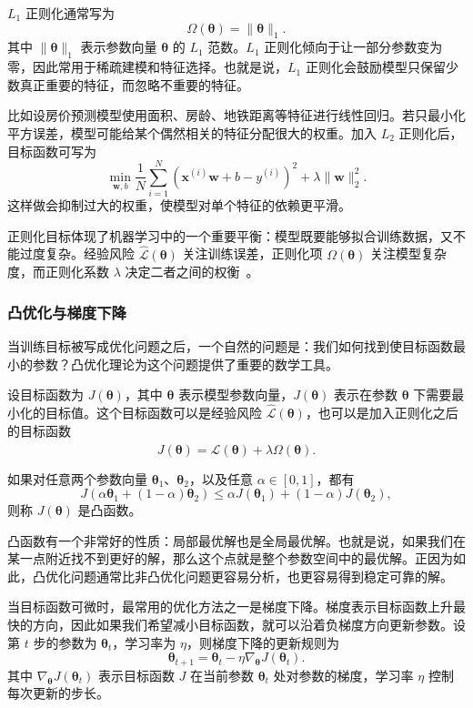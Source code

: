 $L_1$ 正则化通常写为
\[
\Omega(\boldsymbol{\theta})
=
\|\boldsymbol{\theta}\|_1.
\]
其中 $\|\boldsymbol{\theta}\|_1$ 表示参数向量 $\boldsymbol{\theta}$ 的 $L_1$ 范数。$L_1$ 正则化倾向于让一部分参数变为零，因此常用于稀疏建模和特征选择。也就是说，$L_1$ 正则化会鼓励模型只保留少数真正重要的特征，而忽略不重要的特征。


比如设房价预测模型使用面积、房龄、地铁距离等特征进行线性回归。若只最小化平方误差，模型可能给某个偶然相关的特征分配很大的权重。加入 $L_2$ 正则化后，目标函数可写为
  \[
  \min_{\mathbf{w},b}
  \frac{1}{N}
  \sum_{i=1}^{N}
  \left(
    \mathbf{x}^{(i)}\mathbf{w}+b-y^{(i)}
  \right)^2
  +
  \lambda\|\mathbf{w}\|_2^2.
  \]
这样做会抑制过大的权重，使模型对单个特征的依赖更平滑。


正则化目标体现了机器学习中的一个重要平衡：模型既要能够拟合训练数据，又不能过度复杂。经验风险 $\hat{\mathcal{L}}(\boldsymbol{\theta})$ 关注训练误差，正则化项 $\Omega(\boldsymbol{\theta})$ 关注模型复杂度，而正则化系数 $\lambda$ 决定二者之间的权衡~\cite{GoodfellowEtAl2016DeepLearning}。

\subsubsection{凸优化与梯度下降}

当训练目标被写成优化问题之后，一个自然的问题是：我们如何找到使目标函数最小的参数？凸优化理论为这个问题提供了重要的数学工具。

设目标函数为 $J(\boldsymbol{\theta})$，其中 $\boldsymbol{\theta}$ 表示模型参数向量，$J(\boldsymbol{\theta})$ 表示在参数 $\boldsymbol{\theta}$ 下需要最小化的目标值。这个目标函数可以是经验风险 $\hat{\mathcal{L}}(\boldsymbol{\theta})$，也可以是加入正则化之后的目标函数
\[
J(\boldsymbol{\theta})
=
\hat{\mathcal{L}}(\boldsymbol{\theta})
+
\lambda \Omega(\boldsymbol{\theta}).
\]

如果对任意两个参数向量 $\boldsymbol{\theta}_1$、$\boldsymbol{\theta}_2$，以及任意 $\alpha\in[0,1]$，都有
\[
J(\alpha\boldsymbol{\theta}_1 + (1-\alpha)\boldsymbol{\theta}_2)
\leq
\alpha J(\boldsymbol{\theta}_1)
+
(1-\alpha)J(\boldsymbol{\theta}_2),
\]
则称 $J(\boldsymbol{\theta})$ 是凸函数。

凸函数有一个非常好的性质：局部最优解也是全局最优解。也就是说，如果我们在某一点附近找不到更好的解，那么这个点就是整个参数空间中的最优解。正因为如此，凸优化问题通常比非凸优化问题更容易分析，也更容易得到稳定可靠的解。

当目标函数可微时，最常用的优化方法之一是梯度下降。梯度表示目标函数上升最快的方向，因此如果我们希望减小目标函数，就可以沿着负梯度方向更新参数。设第 $t$ 步的参数为 $\boldsymbol{\theta}_t$，学习率为 $\eta$，则梯度下降的更新规则为
\[
\boldsymbol{\theta}_{t+1}
=
\boldsymbol{\theta}_t
-
\eta
\nabla_{\boldsymbol{\theta}}J(\boldsymbol{\theta}_t).
\]
其中 $\nabla_{\boldsymbol{\theta}}J(\boldsymbol{\theta}_t)$ 表示目标函数 $J$ 在当前参数 $\boldsymbol{\theta}_t$ 处对参数的梯度，学习率 $\eta$ 控制每次更新的步长。

